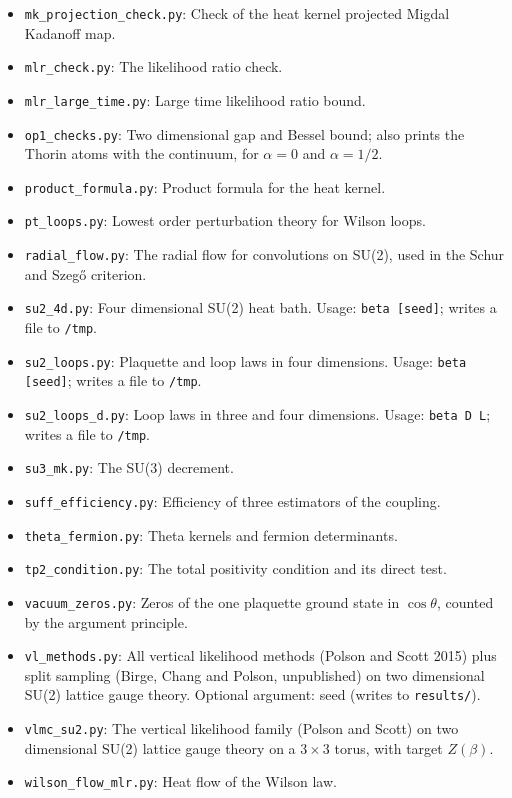 \begin{itemize}
\item \texttt{mk\_projection\_check.py}: Check of the heat kernel projected Migdal Kadanoff map.
\item \texttt{mlr\_check.py}: The likelihood ratio check.
\item \texttt{mlr\_large\_time.py}: Large time likelihood ratio bound.
\item \texttt{op1\_checks.py}: Two dimensional gap and Bessel bound; also prints the Thorin atoms with the continuum, for $\alpha=0$ and $\alpha=1/2$.
\item \texttt{product\_formula.py}: Product formula for the heat kernel.
\item \texttt{pt\_loops.py}: Lowest order perturbation theory for Wilson loops.
\item \texttt{radial\_flow.py}: The radial flow for convolutions on SU(2), used in the Schur and Szeg\H o criterion.
\item \texttt{su2\_4d.py}: Four dimensional SU(2) heat bath. Usage: \texttt{beta [seed]}; writes a file to \texttt{/tmp}.
\item \texttt{su2\_loops.py}: Plaquette and loop laws in four dimensions. Usage: \texttt{beta [seed]}; writes a file to \texttt{/tmp}.
\item \texttt{su2\_loops\_d.py}: Loop laws in three and four dimensions. Usage: \texttt{beta D L}; writes a file to \texttt{/tmp}.
\item \texttt{su3\_mk.py}: The SU(3) decrement.
\item \texttt{suff\_efficiency.py}: Efficiency of three estimators of the coupling.
\item \texttt{theta\_fermion.py}: Theta kernels and fermion determinants.
\item \texttt{tp2\_condition.py}: The total positivity condition and its direct test.
\item \texttt{vacuum\_zeros.py}: Zeros of the one plaquette ground state in $\cos\theta$, counted by the argument principle.
\item \texttt{vl\_methods.py}: All vertical likelihood methods (Polson and Scott 2015) plus split sampling (Birge, Chang and Polson, unpublished) on two dimensional SU(2) lattice gauge theory. Optional argument: seed (writes to \texttt{results/}).
\item \texttt{vlmc\_su2.py}: The vertical likelihood family (Polson and Scott) on two dimensional SU(2) lattice gauge theory on a $3\times 3$ torus, with target $Z(\beta)$.
\item \texttt{wilson\_flow\_mlr.py}: Heat flow of the Wilson law.
\end{itemize}
